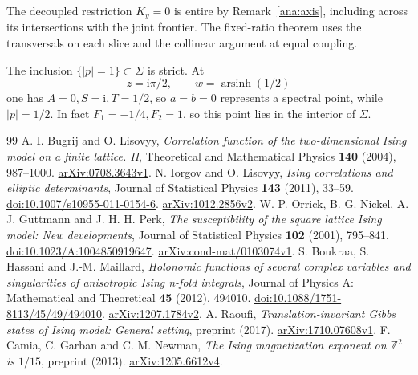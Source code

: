 \documentclass[11pt]{article}
\numberwithin{equation}{section}
\theoremstyle{definition}
\newcommand{\ii}{\mathrm i}
\begin{document}
The decoupled restriction \(K_y=0\) is entire by
Remark~\ref{ana:axis}, including across its intersections with the
joint frontier. The fixed-ratio theorem uses the transversals on each
slice and the collinear argument at equal coupling.

The inclusion \(\{|p|=1\}\subset\Sigma\) is strict. At
\[
 z=\ii\pi/2,\qquad w=\operatorname{arsinh}(1/2)
\]
one has \(A=0,S=\ii,T=1/2\), so \(a=b=0\) represents a
spectral point, while \(|p|=1/2\). In fact \(F_1=-1/4,F_2=1\),
so this point lies in the interior of \(\Sigma\).



\begin{thebibliography}{99}
 A. I. Bugrij and O. Lisovyy,
\emph{Correlation function of the two-dimensional Ising model on a
finite lattice. II}, Theoretical and Mathematical Physics \textbf{140}
(2004), 987--1000. \href{https://arxiv.org/abs/0708.3643v1}{arXiv:0708.3643v1}.
 N. Iorgov and O. Lisovyy,
\emph{Ising correlations and elliptic determinants},
Journal of Statistical Physics \textbf{143} (2011), 33--59.
\href{https://doi.org/10.1007/s10955-011-0154-6}{doi:10.1007/s10955-011-0154-6}.
\href{https://arxiv.org/abs/1012.2856v2}{arXiv:1012.2856v2}.
 W. P. Orrick, B. G. Nickel, A. J. Guttmann and J. H. H. Perk,
\emph{The susceptibility of the square lattice Ising model: New developments},
Journal of Statistical Physics \textbf{102} (2001), 795--841.
\href{https://doi.org/10.1023/A:1004850919647}{doi:10.1023/A:1004850919647}.
\href{https://arxiv.org/abs/cond-mat/0103074v1}{arXiv:cond-mat/0103074v1}.
 S. Boukraa, S. Hassani and J.-M. Maillard,
\emph{Holonomic functions of several complex variables and singularities
of anisotropic Ising n-fold integrals}, Journal of Physics A:
Mathematical and Theoretical \textbf{45} (2012), 494010.
\href{https://doi.org/10.1088/1751-8113/45/49/494010}{doi:10.1088/1751-8113/45/49/494010}.
\href{https://arxiv.org/abs/1207.1784v2}{arXiv:1207.1784v2}.
 A. Raoufi,
\emph{Translation-invariant Gibbs states of Ising model: General setting},
preprint (2017).
\href{https://arxiv.org/abs/1710.07608v1}{arXiv:1710.07608v1}.
 F. Camia, C. Garban and C. M. Newman,
\emph{The Ising magnetization exponent on \(\mathbb Z^2\) is \(1/15\)},
preprint (2013).
\href{https://arxiv.org/abs/1205.6612v4}{arXiv:1205.6612v4}.

\end{thebibliography}
\end{document}
